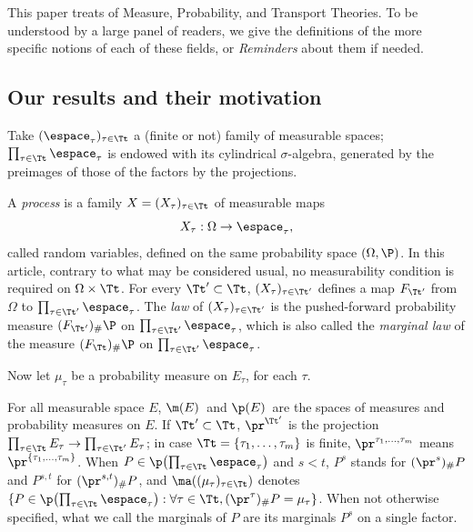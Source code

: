 This paper treats of Measure, Probability, and Transport Theories. To be understood by a large panel of readers, we give the definitions of the more specific notions of each of these fields, or \emph{Reminders} about them if needed.

\subsection{Our results and their motivation}\label{subsec:resultats}

Take $(\espace_\tau)_{\tau\in\Tt}$ a (finite or not) family of measurable spaces; $\prod_{\tau\in\Tt}\espace_\tau$ is endowed with its cylindrical $\sigma$-algebra, generated by the preimages of those of the factors by the projections.

\begin{reminder}\label{reminder:process}
A \emph{process}
is a family $X=(X_\tau)_{\tau\in\Tt}$ of measurable maps
\[
X_\tau:\Omega\to \espace_\tau,
\]
called random variables, defined on the same probability space $(\Omega,\P)$. In this article, contrary to what may be considered usual, no measurability condition is required on $\Omega\times \Tt$. For every $\Tt'\subset \Tt$, $(X_\tau)_{\tau\in\Tt'}$ defines a map $F_{\Tt'}$ from~$\Omega$ to $\prod_{\tau\in\Tt'}\espace_\tau$. The \emph{law} of $(X_\tau)_{\tau\in\Tt'}$ is the pushed-forward probability measure $(F_{\Tt'})_\#\P$ on $\prod_{\tau\in\Tt'}\espace_\tau$, which is also called the \emph{marginal law} of the measure $(F_{\Tt})_\#\P$ on $\prod_{\tau\in\Tt'}\espace_\tau$. \end{reminder}

Now let $\mu_\tau$ be a probability measure on $E_\tau$, for each $\tau$.

\begin{notation}\label{notation:marg} For all measurable space $E$, $\m(E)$\ and $\p(E)$\ are the spaces of measures and probability measures on $E$. If $\Tt'\subset\Tt$, $\pr^{\Tt'}$ is the projection $\prod_{\tau\in\Tt}E_\tau\to\prod_{\tau\in\Tt'}E_\tau$; in case $\Tt=\{\tau_1,\ldots,\tau_m\}$ is finite, $\pr^{\tau_1,\ldots,\tau_m}$ means $\pr^{\{\tau_1,\ldots,\tau_m\}}$. When $P\in\p\bigl(\prod_{\tau\in\Tt}\espace_\tau\bigr)$ and $s<t$, $P^s$ stands for $(\pr^{s})_\#P$ and $P^{s,t}$ for $(\pr^{s,t})_\#P$, and $\ma((\mu_\tau)_{\tau\in\Tt})$ denotes $\{P\in\p\bigl(\prod_{\tau\in\Tt}\espace_\tau\bigr):\forall\tau\in\Tt,(\pr^\tau)_\#P=\mu_\tau\}$. When not otherwise specified, what we call the marginals of $P$ are its marginals $P^s$ on a single factor.
\end{notation}

